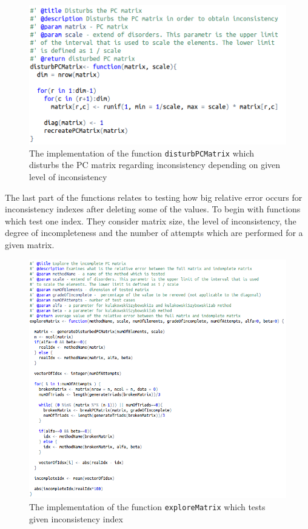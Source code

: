 \begin{figure}[h]
\centerline{\includegraphics[scale=0.75]{images/kod12.png}}
\caption{The implementation of the function \texttt{disturbPCMatrix} which disturbs the PC matrix regarding inconsistency depending on given level of inconsistency}
\label{fig:rstudio}
\end{figure}


The last part of the functions relates to testing how big relative error occurs for inconsistency indexes after deleting some of the values. To begin with functions which test one index. They consider matrix size, the level of inconsistency, the degree of incompleteness and the number of attempts which are performed for a given matrix.

\begin{figure}[!]
\centerline{\includegraphics[scale=0.58]{images/kod21.png}}
\caption{The implementation of the function \texttt{exploreMatrix} which tests given inconsistency index}
\label{fig:rstudio}
\end{figure}

